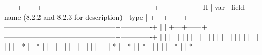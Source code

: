   +---+------+-----------------------------------------------+-------------+
  | H | var  | field name (8.2.2 and 8.2.3 for description)  | type        |
  +---+------+-----------------------------------------------+-------------+
  |   | %
  +---+------+-----------------------------------------------+-------------+
  |   | %
  |   | %
  |   | %
  |   | %
  |   | %
  |   | %
  |   | %
  |   | %
  |   | %
  |   | %
  |   | %
  |   | %
  |   | %
  | * | %
  | * | %
  |   | %
  |   | %
  |   | %
  |   | %
  |   | %
  |   | %
  |   | %
  | * | %
  | * | %
  | * | %
  |   | %
  |   | %
  | * | %
  | * | %
